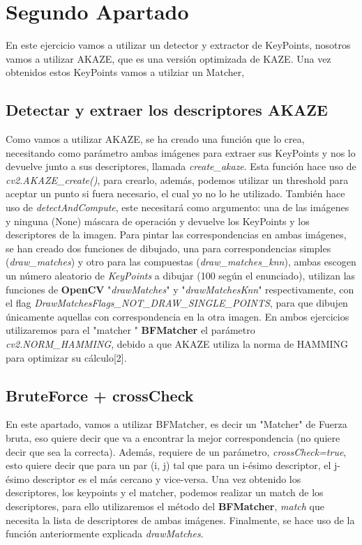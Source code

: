 \documentclass{article}
\begin{document}
\newpage

\section{Segundo Apartado}

En este ejercicio vamos a utilizar un detector y extractor de KeyPoints, nosotros vamos a utilizar AKAZE, que es una versión optimizada de KAZE. Una vez obtenidos estos KeyPoints vamos a utilziar un Matcher, 

\subsection{Detectar y extraer los descriptores AKAZE}
Como vamos a utilizar AKAZE, se ha creado una función que lo crea, necesitando como parámetro ambas imágenes para extraer sus KeyPoints y nos lo devuelve junto a sus descriptores, llamada \textit{create\_akaze}. Esta función hace uso de \textit{cv2.AKAZE\_create()}, para crearlo, además, podemos utilizar un threshold para aceptar un punto si fuera necesario, el cual yo no lo he utilizado. También hace uso de \textit{detectAndCompute}, este necesitará como argumento: una de las imágenes y ninguna (None) máscara de operación y devuelve los KeyPoints y los descriptores de la imagen.
\newline
Para pintar las correspondencias en ambas imágenes, se han creado dos funciones de dibujado, una para correspondencias simples (\textit{draw\_matches}) y otro para las compuestas (\textit{draw\_matches\_knn}), ambas escogen un número aleatorio de \textit{KeyPoints} a dibujar (100 según el enunciado), utilizan las funciones de \textbf{OpenCV} "\textit{drawMatches}" y "\textit{drawMatchesKnn}" respectivamente, con el flag \textit{DrawMatchesFlags\_NOT\_DRAW\_SINGLE\_POINTS}, para que dibujen únicamente aquellas con correspondencia en la otra imagen.
\newline
En ambos ejercicios utilizaremos para el "matcher " \textbf{BFMatcher} el parámetro \textit{cv2.NORM\_HAMMING}, debido a que AKAZE utiliza la norma de HAMMING para optimizar su cálculo[2].

\subsection{BruteForce + crossCheck}
En este apartado, vamos a utilizar BFMatcher, es decir un "Matcher" de Fuerza bruta, eso quiere decir que va a encontrar la mejor correspondencia (no quiere decir que sea la correcta). Además, requiere de un parámetro, \textit{crossCheck=true}, esto quiere decir que para un par (i, j) tal que para un i-ésimo descriptor, el j-ésimo descriptor es el más cercano y vice-versa.
\newline
Una vez obtenido los descriptores, los keypoints y el matcher, podemos realizar un match de los descriptores, para ello utilizaremos el método del \textbf{BFMatcher}, \textit{match} que necesita la lista de descriptores de ambas imágenes.
\newline
Finalmente, se hace uso de la función anteriormente explicada \textit{drawMatches}.
\end{document}
